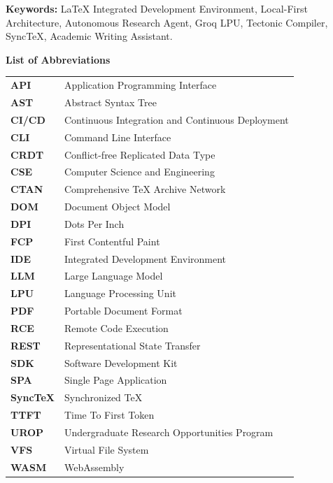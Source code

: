 \documentclass[12pt,a4paper,twoside]{article}
\newcommand{\emptypara}{\mbox{}\par}
\newcommand{\hone}[1]{%
  \begingroup\setlength{\parskip}{0pt}%
  {\fontsize{18pt}{21.6pt}\selectfont\bfseries #1}\par\nopagebreak
  \vspace{6pt}
  \endgroup}
\begin{document}
\vspace{10pt}
\noindent\textbf{Keywords:} \LaTeX{} Integrated Development Environment, Local-First Architecture, Autonomous Research Agent, Groq LPU, Tectonic Compiler, Sync\TeX{}, Academic Writing Assistant.

\newpage
\hone{List of Abbreviations}
\emptypara

\noindent
\begin{tabularx}{\textwidth}{@{}p{}X@{}}
\textbf{API} & Application Programming Interface \\
\textbf{AST} & Abstract Syntax Tree \\
\textbf{CI/CD} & Continuous Integration and Continuous Deployment \\
\textbf{CLI} & Command Line Interface \\
\textbf{CRDT} & Conflict-free Replicated Data Type \\
\textbf{CSE} & Computer Science and Engineering \\
\textbf{CTAN} & Comprehensive \TeX{} Archive Network \\
\textbf{DOM} & Document Object Model \\
\textbf{DPI} & Dots Per Inch \\
\textbf{FCP} & First Contentful Paint \\
\textbf{IDE} & Integrated Development Environment \\
\textbf{LLM} & Large Language Model \\
\textbf{LPU} & Language Processing Unit \\
\textbf{PDF} & Portable Document Format \\
\textbf{RCE} & Remote Code Execution \\
\textbf{REST} & Representational State Transfer \\
\textbf{SDK} & Software Development Kit \\
\textbf{SPA} & Single Page Application \\
\textbf{Sync\TeX} & Synchronized \TeX{} \\
\textbf{TTFT} & Time To First Token \\
\textbf{UROP} & Undergraduate Research Opportunities Program \\
\textbf{VFS} & Virtual File System \\
\textbf{WASM} & WebAssembly \\
\end{tabularx}
\end{document}
